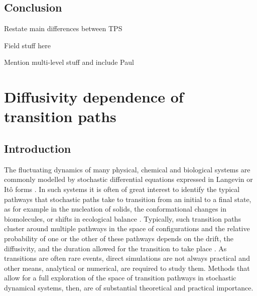 

\section{Conclusion}

Restate main differences between TPS

Field stuff here

Mention multi-level stuff and include Paul


\chapter{Diffusivity dependence of transition paths} \label{ch:Diffusivity dependence of transition paths}

\section{Introduction}


The fluctuating dynamics of many physical, chemical and biological
systems are commonly modelled by stochastic differential equations
expressed in Langevin or Itô forms \citep{kampenStochasticProcessesPhysics2011,gardinerStochasticMethodsHandbook2010,riskenFokkerPlanckEquationMethods2012,bharucha-reidElementsTheoryMarkov2012}.
In such systems it is often of great interest to identify the typical
pathways that stochastic paths take to transition from an initial
to a final state, as for example in the nucleation of solids, the
conformational changes in biomolecules, or shifts in ecological balance
\citep{faccioliDominantPathwaysProtein2006, demarcoPhaseTransitionModel2001, gardnerConstructionGeneticToggle2000, mangelBarrierTransitionsDriven1994, wolynesNavigatingFoldingRoutes1995, huangMolecularMathematicalBasis2012, paninskiMostLikelyVoltage2006, noltingBallsCupsQuasipotentials2016, leeFindingMultipleReaction2017}.
Typically, such transition paths cluster around multiple pathways
in the space of configurations and the relative probability of one
or the other of these pathways depends on the drift, the diffusivity,
and the duration allowed for the transition to take place \citep{onsagerFluctuationsIrreversibleProcesses1953,bachFunctionalsPathsDiffusion1977,itoProbabilisticConstructionLagrangean1978,ikedaStochasticDifferentialEquations2014}.
As transitions are often rare events, direct simulations are not always
practical and other means, analytical or numerical, are required to
study them. Methods that allow for a full exploration of the space
of transition pathways in stochastic dynamical systems, then, are
of substantial theoretical and practical importance.

